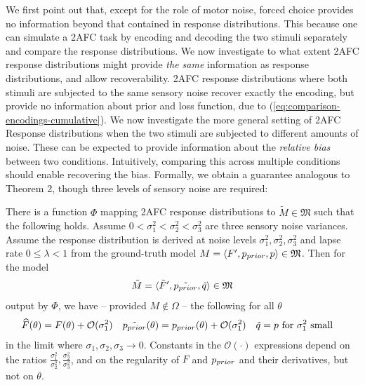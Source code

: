 \documentclass[si.tex]{subfiles}
\begin{document}
We first point out that, except for the role of motor noise, forced choice provides no information beyond that contained in response distributions. This because one can simulate a 2AFC task by encoding and decoding the two stimuli separately and compare the response distributions.
We now investigate to what extent 2AFC response distributions might provide \emph{the same} information as response distributions, and allow recoverability.
2AFC response distributions where both stimuli are subjected to the same sensory noise recover exactly the encoding, but provide no information about prior and loss function, due to (\ref{eq:comparison-encodings-cumulative}).
We now investigate the more general setting of 2AFC Response distributions when the two stimuli are subjected to different amounts of noise.
These can be expected to provide information about the \emph{relative bias} between two conditions.
Intuitively, comparing this across multiple conditions should enable recovering the bias.
Formally, we obtain a guarantee analogous to Theorem 2, though three levels of sensory noise are required:
%
%
%
%
\begin{thm}
%
There is a function $\Phi$ mapping 2AFC response distributions to $\tilde{M} \in \mathfrak{M}$ such that the following holds.
Assume $0 < \sigma_1^2 < \sigma_2^2 < \sigma_3^2$ are three sensory noise variances.
Assume the response distribution is derived at noise levels \(\sigma_1^2, \sigma_2^2, \sigma_3^2\) and lapse rate \(0 \leq \lambda < 1\) from the ground-truth model \(M = \langle F', p_{prior},p \rangle \in \mathfrak{M}\).
Then for the model
\begin{equation}
\tilde{M} = \langle \tilde{F}', \tilde{p_{prior}},\tilde{q}\rangle \in \mathfrak{M}
\end{equation}
output by $\Phi$, we have -- provided $M \not\in \Omega$ -- the following for all $\theta$
\begin{align*}
    \widehat{F}(\theta) &= F(\theta) + \mathcal{O}(\sigma_1^2) &
    \tilde{p_{prior}}(\theta) &= p_{prior}(\theta) + \mathcal{O}(\sigma_1^2) &
    \tilde{q} &= p  \text{ for $\sigma_1^2$ small}
\end{align*}
in the limit where $\sigma_1, \sigma_2, \sigma_3 \rightarrow 0$.
Constants in the $\mathcal{O}(\cdot)$ expressions depend on the ratios  $\frac{\sigma_1^2}{\sigma_2^2}, \frac{\sigma_2^2}{\sigma_3^2}$, and on the regularity of $F$ and $p_{prior}$ and their derivatives, but not on $\theta$.

\end{thm}
\end{document}

